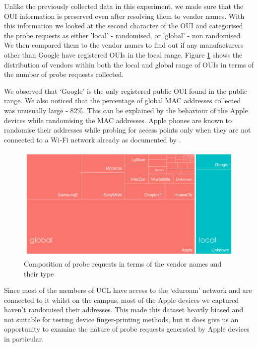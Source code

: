 Unlike the previously collected data in this experiment, we made sure that the OUI information is preserved even after resolving them to vendor names.
With this information we looked at the second character of the OUI and categorised the probe requests as either 'local' - randomised, or 'global' - non randomised.
We then compared them to the vendor names to find out if any manufacturers other than Google have registered OUIs in the local range.
Figure \ref{figure:collection:ucl:treemap} shows the distribution of vendors within both the local and global range of OUIs in terms of the number of probe requests collected.

We observed that `Google' is the only registered public OUI found in the public range. 
We also noticed that the percentage of global MAC addresses collected was unusually large - 82\%.
This can be explained by the behaviour of the Apple devices while randomising the MAC addresses. 
Apple phones are known to randomise their addresses while probing for access points only when they are not connected to a Wi-Fi network already as documented by \citet{vanhoef2016}.

\begin{figure}
  \includegraphics{images/ucl-local-treemap.png}
  \caption{Composition of probe requests in terms of the vendor names and their type}
  \label{figure:collection:ucl:treemap}
\end{figure}

Since most of the members of UCL have access to the `eduroam' network and are connected to it whilst on the campus, most of the Apple devices we captured haven't randomised their addresses.
This made this dataset heavily biased and not suitable for testing device finger-printing methods, but it does give us an opportunity to examine the nature of probe requests generated by Apple devices in particular.

